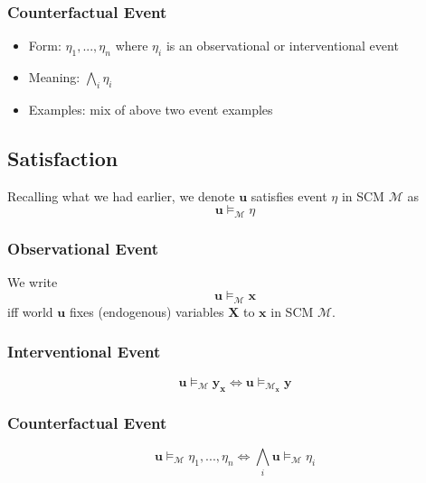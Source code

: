 \documentclass[11pt]{article}
\newcommand{\bu}{\mathbf{u}}
\newcommand{\bx}{\mathbf{x}}
\newcommand{\by}{\mathbf{y}}
\begin{document}
\subsubsection{Counterfactual Event}
\begin{itemize}
	\item Form: $\eta_1, ..., \eta_n$ where $\eta_i$ is an observational or interventional event
	\item Meaning: $\bigwedge_i \eta_ i$
	\item Examples: mix of above two event examples
\end{itemize}

\subsection{Satisfaction}
Recalling what we had earlier, we denote $\bu$ satisfies event $\eta$ in SCM $\mathcal M$ as 
\begin{equation}
	\mathbf u \vDash_{\mathcal M} \eta
\end{equation}

\subsubsection{Observational Event}
We write 
\begin{equation}
	\bu \vDash_{\mathcal M} \mathbf x
\end{equation}
iff world $\bu$ fixes (endogenous) variables $\mathbf X$ to $\bx$ in SCM $\mathcal M$. 

\subsubsection{Interventional Event}
\begin{equation}
	\bu \vDash_{\mathcal M} \by_\bx \iff \bu \vDash_{\mathcal M_\bx} \by
\end{equation}

\subsubsection{Counterfactual Event}
\begin{equation}
	\bu \vDash_{\mathcal M} \eta_1, ..., \eta_n \iff \bigwedge_i \bu \vDash_{\mathcal M} \eta_i
\end{equation}
\end{document}
